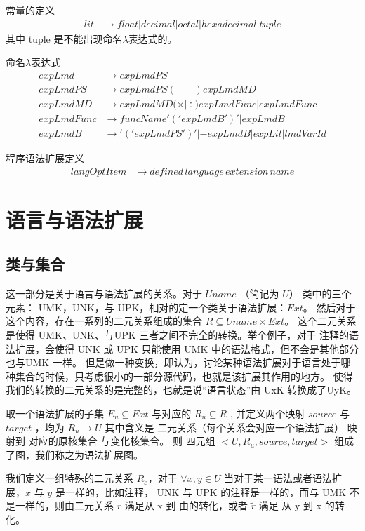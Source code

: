 \documentclass{ctexart}
\begin{document}
常量的定义
\begin{align*}
lit &\rightarrow float|decimal|octal|hexadecimal|tuple
\end{align*}
其中 tuple 是不能出现命名$\lambda$表达式的。

命名$\lambda$表达式
\begin{align*}
expLmd &\rightarrow expLmdPS \\
expLmdPS &\rightarrow expLmdPS (+|-) expLmdMD \\
expLmdMD &\rightarrow expLmdMD (\times|\div) expLmdFunc | expLmdFunc \\
expLmdFunc &\rightarrow funcName'('expLmdB')' | expLmdB \\
expLmdB &\rightarrow '('expLmdPS')' | -expLmdB | expLit | lmdVarId
\end{align*}

程序语法扩展定义
\begin{align*}
langOptItem &\rightarrow \mathit{defined\,language\,extension\,name}
\end{align*}

\section{语言与语法扩展}
\label{sec:languageextension}

\subsection{类与集合}
\label{sec:langexte:classNset}

这一部分是关于语言与语法扩展的关系。对于 $Uname$ （简记为 $U$） 类中的三个元素： UMK，UNK，与 UPK，相对的定一个类关于语法扩展：$Ext$。
然后对于这个内容，存在一系列的二元关系组成的集合 $ R \subseteq Uname \times Ext $。 这个二元关系是使得 UMK、UNK、与UPK
三者之间不完全的转换。举个例子，对于 注释的语法扩展，会使得 UNK 或 UPK 只能使用 UMK 中的语法格式，但不会是其他部分也与UMK 一样。
但是做一种变换，即认为，讨论某种语法扩展对于语言处于哪种集合的时候，只考虑很小的一部分源代码，也就是该扩展其作用的地方。
使得 我们的转换的二元关系的是完整的，也就是说“语言状态”由 UxK 转换成了UyK。

取一个语法扩展的子集 $E_u \subseteq Ext$ 与对应的 $R_u \subseteq R$ , 并定义两个映射 $source$ 与 $target$ ，均为
$ R_u \rightarrow U$ 其中含义是 二元关系（每个关系会对应一个语法扩展） 映射到 对应的原核集合 与变化核集合。
则 四元组 $<U,R_u,source,target>$ 组成了图，我们称之为语法扩展图。

我们定义一组特殊的二元关系 $R_\varepsilon$，对于 $ \forall x,y \in U$ 当对于某一语法或者语法扩展，$x$ 与 $y$ 是一样的，比如注释，
UNK 与 UPK 的注释是一样的，而与 UMK 不是一样的，则由二元关系 $r$ 满足从 x 到 由的转化，或者 $\widetilde{r}$ 满足 从 y 到 x 的转化。
\end{document}
